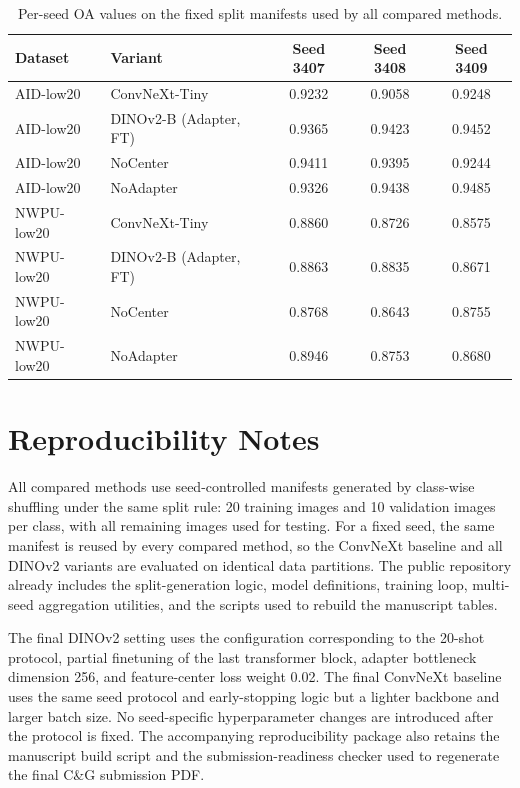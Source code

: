 \documentclass[a4paper,fleqn]{cas-sc}
\begin{document}
\begin{table}
  \centering
  \caption{Per-seed OA values on the fixed split manifests used by all compared methods.}
  \label{tab:seedwise_results}
  \begin{tabular}{l l c c c}
    \toprule
    Dataset & Variant & Seed 3407 & Seed 3408 & Seed 3409 \\
    \midrule
    AID-low20 & ConvNeXt-Tiny & 0.9232 & 0.9058 & 0.9248 \\
    AID-low20 & DINOv2-B (Adapter, FT) & 0.9365 & 0.9423 & 0.9452 \\
    AID-low20 & NoCenter & 0.9411 & 0.9395 & 0.9244 \\
    AID-low20 & NoAdapter & 0.9326 & 0.9438 & 0.9485 \\
    NWPU-low20 & ConvNeXt-Tiny & 0.8860 & 0.8726 & 0.8575 \\
    NWPU-low20 & DINOv2-B (Adapter, FT) & 0.8863 & 0.8835 & 0.8671 \\
    NWPU-low20 & NoCenter & 0.8768 & 0.8643 & 0.8755 \\
    NWPU-low20 & NoAdapter & 0.8946 & 0.8753 & 0.8680 \\
    \bottomrule
  \end{tabular}
\end{table}


\section{Reproducibility Notes}
\label{sec:appendix_reproducibility}

All compared methods use seed-controlled manifests generated by class-wise shuffling under the same split rule: 20 training images and 10 validation images per class, with all remaining images used for testing. For a fixed seed, the same manifest is reused by every compared method, so the ConvNeXt baseline and all DINOv2 variants are evaluated on identical data partitions. The public repository already includes the split-generation logic, model definitions, training loop, multi-seed aggregation utilities, and the scripts used to rebuild the manuscript tables.

The final DINOv2 setting uses the configuration corresponding to the 20-shot protocol, partial finetuning of the last transformer block, adapter bottleneck dimension 256, and feature-center loss weight 0.02. The final ConvNeXt baseline uses the same seed protocol and early-stopping logic but a lighter backbone and larger batch size. No seed-specific hyperparameter changes are introduced after the protocol is fixed. The accompanying reproducibility package also retains the manuscript build script and the submission-readiness checker used to regenerate the final C\&G submission PDF.



\end{document}
